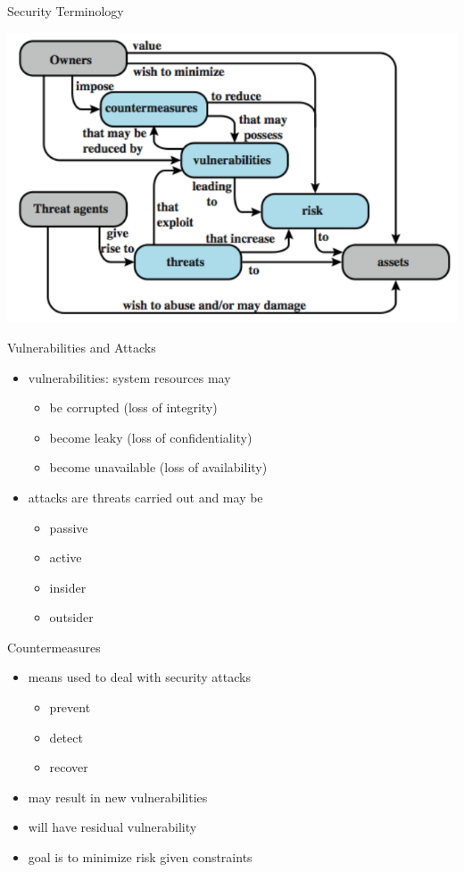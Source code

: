 \documentclass{beamer}
\begin{document}
\begin{frame}{Security Terminology}
  \begin{center}
    \includegraphics[width=0.7\linewidth]{terminology2}
  \end{center}
\end{frame}

\begin{frame}{Vulnerabilities and Attacks }
  \begin{itemize}
    \item vulnerabilities: system resources  may 
      
      \begin{itemize}
        \item be corrupted (loss of integrity) 
        \item become leaky (loss of confidentiality) 
        \item become unavailable (loss of availability) 
      \end{itemize}
    \item attacks are threats carried out and may be 
      \begin{itemize}
        \item passive
        \item active
        \item insider
        \item outsider
      \end{itemize}
  \end{itemize}
\end{frame}

\begin{frame}{Countermeasures}
  
  \begin{itemize}
    \item means used to deal with security attacks 
      
      \begin{itemize}
        \item prevent 
        \item detect 
        \item recover 
      \end{itemize}
    \item may result in new vulnerabilities 
    \item will have residual vulnerability 
    \item goal is to minimize risk given constraints
  \end{itemize}
\end{frame}
\end{document}
